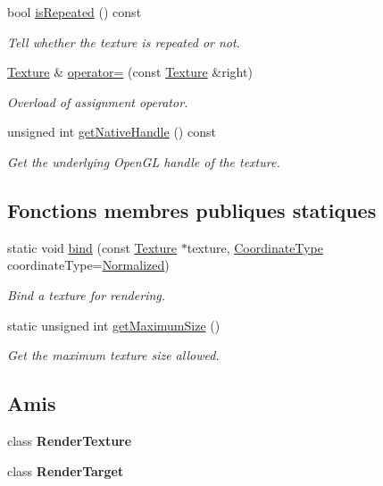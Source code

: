 \begin{DoxyCompactItemize}
bool \hyperlink{classsf_1_1Texture_af1a1a32ca5c799204b2bea4040df7647}{is\+Repeated} () const
\begin{DoxyCompactList}\small\item\em Tell whether the texture is repeated or not. \end{DoxyCompactList}\item 
\hyperlink{classsf_1_1Texture}{Texture} \& \hyperlink{classsf_1_1Texture_a80a089b6b19bb09b83012d5f0e6af9ba}{operator=} (const \hyperlink{classsf_1_1Texture}{Texture} \&right)
\begin{DoxyCompactList}\small\item\em Overload of assignment operator. \end{DoxyCompactList}\item 
unsigned int \hyperlink{classsf_1_1Texture_a674b632608747bfc27b53a4935c835b0}{get\+Native\+Handle} () const
\begin{DoxyCompactList}\small\item\em Get the underlying Open\+GL handle of the texture. \end{DoxyCompactList}\end{DoxyCompactItemize}
\subsection*{Fonctions membres publiques statiques}
\begin{DoxyCompactItemize}
\item 
static void \hyperlink{classsf_1_1Texture_ae9a4274e7b95ebf7244d09c7445833b0}{bind} (const \hyperlink{classsf_1_1Texture}{Texture} $\ast$texture, \hyperlink{classsf_1_1Texture_aa6fd3bbe3c334b3c4428edfb2765a82e}{Coordinate\+Type} coordinate\+Type=\hyperlink{classsf_1_1Texture_aa6fd3bbe3c334b3c4428edfb2765a82ea69d6228950882e4d68be4ba4dbe7df73}{Normalized})
\begin{DoxyCompactList}\small\item\em Bind a texture for rendering. \end{DoxyCompactList}\item 
static unsigned int \hyperlink{classsf_1_1Texture_a0bf905d487b104b758549c2e9e20a3fb}{get\+Maximum\+Size} ()
\begin{DoxyCompactList}\small\item\em Get the maximum texture size allowed. \end{DoxyCompactList}\end{DoxyCompactItemize}
\subsection*{Amis}
\begin{DoxyCompactItemize}
\item 
\mbox{\label{classsf_1_1Texture_a2548fc9744f5e43e0276d5627ca178de}} 
class {\bfseries Render\+Texture}
\item 
\mbox{\label{classsf_1_1Texture_aa5afc6f82b7b587ed5ada4d227ce32aa}} 
class {\bfseries Render\+Target}
\end{DoxyCompactItemize}


